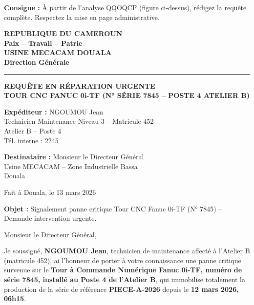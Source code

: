 \documentclass[11pt]{article}
\begin{document}
\begin{exoresolu}
\textbf{Consigne :} À partir de l'analyse QQOQCP (figure ci-dessus), rédigez la requête complète. Respectez la mise en page administrative.

\tcblower

\begin{center}
\textbf{REPUBLIQUE DU CAMEROUN}\\
\textbf{Paix -- Travail -- Patrie}\\
\vspace{0.3cm}
\textbf{USINE MECACAM DOUALA}\\
\textbf{Direction Générale}\\
\vspace{0.5cm}
\rule{\linewidth}{0.5pt}
\vspace{0.3cm}
\textbf{REQUÊTE EN RÉPARATION URGENTE}\\
\textbf{TOUR CNC FANUC 0i-TF (N° SÉRIE 7845 -- POSTE 4 ATELIER B)}
\end{center}

\vspace{0.5cm}
\noindent
\textbf{Expéditeur :} NGOUMOU Jean\\
Technicien Maintenance Niveau 3 -- Matricule 452\\
Atelier B -- Poste 4\\
Tél. interne : 2245

\vspace{0.3cm}
\noindent
\textbf{Destinataire :} Monsieur le Directeur Général\\
Usine MECACAM -- Zone Industrielle Bassa\\
Douala

\vspace{0.3cm}
\noindent
Fait à Douala, le 13 mars 2026

\vspace{0.5cm}
\noindent
\textbf{Objet :} Signalement panne critique Tour CNC Fanuc 0i-TF (N° 7845) -- Demande intervention urgente.

\vspace{0.5cm}
\noindent
Monsieur le Directeur Général,

\vspace{0.3cm}
\noindent
Je soussigné, \textbf{NGOUMOU Jean}, technicien de maintenance affecté à l'Atelier B (matricule 452), ai l'honneur de porter à votre connaissance une panne critique survenue sur le \textbf{Tour à Commande Numérique Fanuc 0i-TF, numéro de série 7845, installé au Poste 4 de l'Atelier B}, qui immobilise totalement la production de la série de référence \textbf{PIECE-A-2026} depuis le \textbf{12 mars 2026, 06h15}.


\end{exoresolu}
\end{document}
